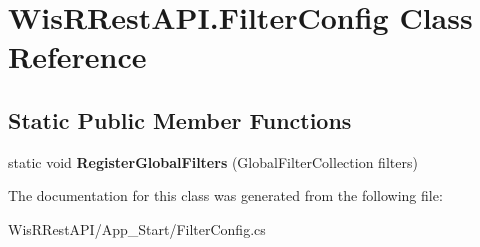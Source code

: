 \hypertarget{class_wis_r_rest_a_p_i_1_1_filter_config}{}\section{Wis\+R\+Rest\+A\+P\+I.\+Filter\+Config Class Reference}
\label{class_wis_r_rest_a_p_i_1_1_filter_config}
\subsection*{Static Public Member Functions}
\begin{DoxyCompactItemize}
\item 
\hypertarget{class_wis_r_rest_a_p_i_1_1_filter_config_a3ee8e51812162e1167bdcd56749c68ce}{}static void {\bfseries Register\+Global\+Filters} (Global\+Filter\+Collection filters)\label{class_wis_r_rest_a_p_i_1_1_filter_config_a3ee8e51812162e1167bdcd56749c68ce}

\end{DoxyCompactItemize}


The documentation for this class was generated from the following file\+:\begin{DoxyCompactItemize}
\item 
Wis\+R\+Rest\+A\+P\+I/\+App\+\_\+\+Start/Filter\+Config.\+cs\end{DoxyCompactItemize}
